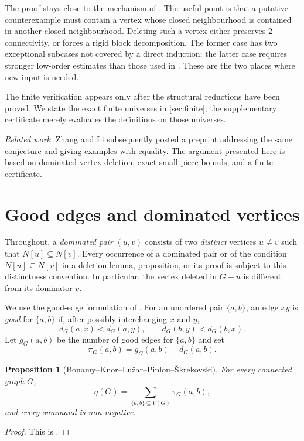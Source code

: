 \documentclass[11pt,reqno]{amsart}
\newtheorem{proposition}[proposition]{Proposition}
\theoremstyle{definition}
\theoremstyle{remark}
\newcommand{\pairc}{\pi}
\begin{document}
The proof stays close to the mechanism of \cite{BKLPS}.  The useful point is
that a putative counterexample must contain a vertex whose closed neighbourhood
is contained in another closed neighbourhood.  Deleting such a vertex either
preserves $2$-connectivity, or forces a rigid block decomposition.  The former
case has two exceptional subcases not covered by a direct induction; the latter
case requires stronger low-order estimates than those used in
\cite[Theorem~4]{BKLPS}.  These are the two places where new input is needed.

The finite verification appears only after the structural reductions have been
proved.  We state the exact finite universes in \cref{sec:finite}; the
supplementary certificate merely evaluates the definitions on those universes.

\medskip
\noindent\emph{Related work.}
Zhang and Li \cite{ZhangLi2026} subsequently posted a preprint addressing
the same conjecture and giving examples with equality.  The argument
presented here is based on dominated-vertex deletion, exact small-piece
bounds, and a finite certificate.

\section{Good edges and dominated vertices}\label{sec:prelim}

Throughout, a \emph{dominated pair} $(u,v)$ consists of two \emph{distinct} vertices $u\ne v$ such that $N[u]\subseteq N[v]$. Every occurrence of a dominated pair or of the condition $N[u]\subseteq N[v]$ in a deletion lemma, proposition, or its proof is subject to this distinctness convention. In particular, the vertex deleted in $G-u$ is different from its dominator $v$.

We use the good-edge formulation of \cite{BKLPS}.  For an unordered pair
$\{a,b\}$, an edge $xy$ is \emph{good} for $\{a,b\}$ if, after possibly
interchanging $x$ and $y$,
\[
 d_G(a,x)<d_G(a,y),\qquad d_G(b,y)<d_G(b,x).
\]
Let $g_G(a,b)$ be the number of good edges for $\{a,b\}$ and set
\[
  \pairc_G(a,b)=g_G(a,b)-d_G(a,b).
\]

\begin{proposition}[Bonamy--Knor--Lu\v{z}ar--Pinlou--\v{S}krekovski]\label{prop:good}
For every connected graph $G$,
\[
  \eta(G)=\sum_{\{a,b\}\subseteq V(G)}\pairc_G(a,b),
\]
and every summand is non-negative.
\end{proposition}

\begin{proof}
This is \cite[Proposition~6]{BKLPS}.
\end{proof}
\end{document}

